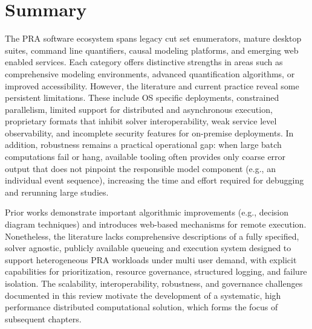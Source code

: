 \section{Summary}
\label{sec:lr-summary}

The PRA software ecosystem spans legacy cut set enumerators, mature desktop suites, command line quantifiers, causal modeling platforms, and emerging web enabled services. Each category offers distinctive strengths in areas such as comprehensive modeling environments, advanced quantification algorithms, or improved accessibility. However, the literature and current practice reveal some persistent limitations. These include OS specific deployments, constrained parallelism, limited support for distributed and asynchronous execution, proprietary formats that inhibit solver interoperability, weak service level observability, and incomplete security features for on-premise deployments. In addition, robustness remains a practical operational gap: when large batch computations fail or hang, available tooling often provides only coarse error output that does not pinpoint the responsible model component (e.g., an individual event sequence), increasing the time and effort required for debugging and rerunning large studies.

Prior works demonstrate important algorithmic improvements (e.g., decision diagram techniques) and introduces web-based mechanisms for remote execution. Nonetheless, the literature lacks comprehensive descriptions of a fully specified, solver agnostic, publicly available queueing and execution system designed to support heterogeneous PRA workloads under multi user demand, with explicit capabilities for prioritization, resource governance, structured logging, and failure isolation. The scalability, interoperability, robustness, and governance challenges documented in this review motivate the development of a systematic, high performance distributed computational solution, which forms the focus of subsequent chapters.
